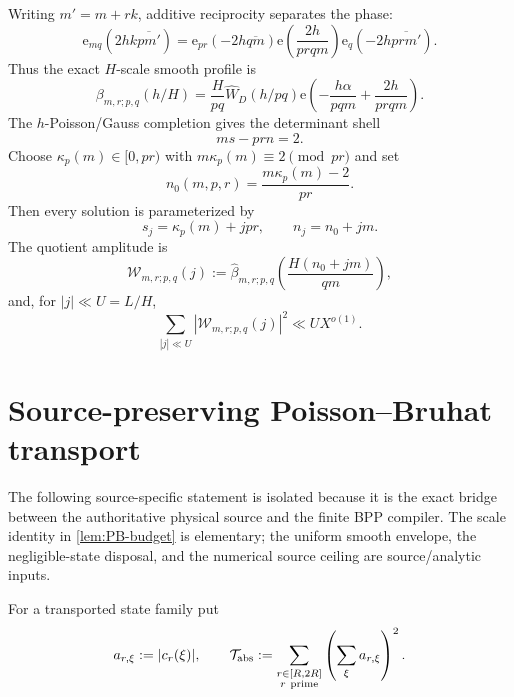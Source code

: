 \documentclass[11pt]{article}
\theoremstyle{definition}
\newcommand{\e}{\mathrm e}
\newcommand{\1}{\mathbf 1}
\begin{document}
Writing $m'=m+rk$, additive reciprocity separates the phase:
\begin{equation}
 \e_{mq}\!\left(2hk\overline{pm'}\right)
 =
 \e_{pr}\!\left(-2h\overline{qm}\right)
 \e\!\left(\frac{2h}{prqm}\right)
 \e_q\!\left(-2h\overline{prm'}\right).
 \label{eq:addrec}
\end{equation}
Thus the exact $H$-scale smooth profile is
\[
 \beta_{m,r;p,q}(h/H)
 =\frac{H}{pq}\widehat W_D(h/pq)
  \e\!\left(-\frac{h\alpha}{pqm}+\frac{2h}{prqm}\right).
\]
The $h$-Poisson/Gauss completion gives the determinant shell
\begin{equation}
    ms-prn=2.
    \label{eq:shell}
\end{equation}
Choose $\kappa_p(m)\in[0,pr)$ with $m\kappa_p(m)\equiv2\pmod{pr}$ and set
\[
    n_0(m,p,r)=\frac{m\kappa_p(m)-2}{pr}.
\]
Then every solution is parameterized by
\[
    s_j=\kappa_p(m)+jpr,\qquad n_j=n_0+jm.
\]
The quotient amplitude is
\begin{equation}
   \mathcal W_{m,r;p,q}(j)
   :=\widehat\beta_{m,r;p,q}
      \!\left(\frac{H(n_0+jm)}{qm}\right),
   \label{eq:Wsrc}
\end{equation}
and, for $|j|\ll U=L/H$,
\begin{equation}
   \sum_{|j|\ll U}|\mathcal W_{m,r;p,q}(j)|^2\ll U X^{o(1)}.
   \label{eq:Wsrcnorm}
\end{equation}

\section{Source-preserving Poisson--Bruhat transport}
\label{sec:PB}
The following source-specific statement is isolated because it is the exact
bridge between the authoritative physical source and the finite BPP compiler.
The scale identity in \cref{lem:PB-budget} is elementary; the uniform smooth
envelope, the negligible-state disposal, and the numerical source ceiling are
source/analytic inputs.

For a transported state family put
\[
 a_{r,\xi}:=|c_r(\xi)|,
 \qquad
 \mathcal T_{\rm abs}:=
 \sum_{\substack{r\in[R,2R]\\ r\ \mathrm{prime}}}
      \left(\sum_{\xi} a_{r,\xi}\right)^2.
\]
\end{document}
